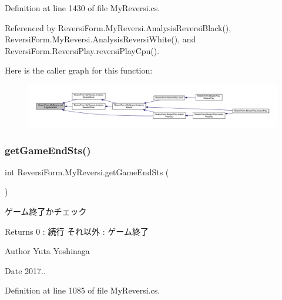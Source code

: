 Definition at line 1430 of file My\+Reversi.\+cs.



Referenced by Reversi\+Form.\+My\+Reversi.\+Analysis\+Reversi\+Black(), Reversi\+Form.\+My\+Reversi.\+Analysis\+Reversi\+White(), and Reversi\+Form.\+Reversi\+Play.\+reversi\+Play\+Cpu().

Here is the caller graph for this function\+:
\nopagebreak
\begin{figure}[H]
\begin{center}
\leavevmode
\includegraphics[width=350pt]{class_reversi_form_1_1_my_reversi_a64216270f06c7c309d39bfcb681dd1b3_icgraph}
\end{center}
\end{figure}
\mbox{\label{class_reversi_form_1_1_my_reversi_aa39c8c111afeb4ea3bf2befbd9f1434b}} 
\subsubsection{\texorpdfstring{get\+Game\+End\+Sts()}{getGameEndSts()}}
{\footnotesize\ttfamily int Reversi\+Form.\+My\+Reversi.\+get\+Game\+End\+Sts (\begin{DoxyParamCaption}{ }\end{DoxyParamCaption})}



ゲーム終了かチェック 

\begin{DoxyReturn}{Returns}
0 \+: 続行 それ以外 \+: ゲーム終了 
\end{DoxyReturn}
\begin{DoxyAuthor}{Author}
Yuta Yoshinaga 
\end{DoxyAuthor}
\begin{DoxyDate}{Date}
2017.. 
\end{DoxyDate}


Definition at line 1085 of file My\+Reversi.\+cs.



